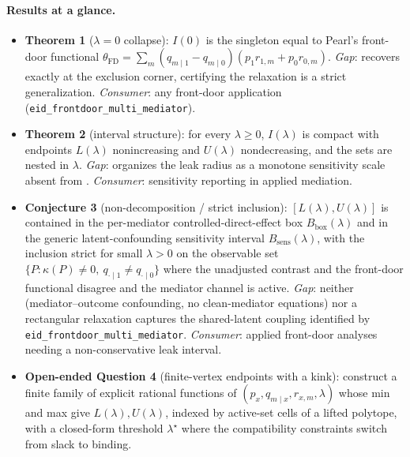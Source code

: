 \documentclass[11pt]{article}
\theoremstyle{definition}
\theoremstyle{plain}
\theoremstyle{remark}
\begin{document}
\paragraph{Results at a glance.}
\begin{itemize}[leftmargin=1.5em,itemsep=2pt]
  \item \textbf{Theorem 1} ($\lambda=0$ collapse): $I(0)$ is the singleton equal to Pearl's front-door
        functional $\theta_{\mathrm{FD}}=\sum_m(q_{m\mid1}-q_{m\mid0})(p_1 r_{1,m}+p_0 r_{0,m})$.
        \emph{Gap}: recovers \citet{Pearl1995CausalDiagrams} exactly at the exclusion corner, certifying
        the relaxation is a strict generalization. \emph{Consumer}: any front-door application
        (\texttt{eid\_frontdoor\_multi\_mediator}).
  \item \textbf{Theorem 2} (interval structure): for every $\lambda\ge0$, $I(\lambda)$ is compact with
        endpoints $L(\lambda)$ nonincreasing and $U(\lambda)$ nondecreasing, and the sets are nested in
        $\lambda$. \emph{Gap}: organizes the leak radius as a monotone sensitivity scale absent from
        \citet{Pearl1995CausalDiagrams}. \emph{Consumer}: sensitivity reporting in applied mediation.
  \item \textbf{Conjecture 3} (non-decomposition / strict inclusion): $[L(\lambda),U(\lambda)]$ is
        contained in the per-mediator controlled-direct-effect box $B_{\mathrm{box}}(\lambda)$ and in the
        generic latent-confounding sensitivity interval $B_{\mathrm{sens}}(\lambda)$, with the inclusion
        strict for small $\lambda>0$ on the observable set
        $\{P:\kappa(P)\neq0,\ q_{\cdot\mid1}\neq q_{\cdot\mid0}\}$ where the unadjusted contrast and the
        front-door functional disagree and the mediator channel is active. \emph{Gap}: neither
        \citet{DingVanderWeele2016SharpMediationSensitivity} (mediator--outcome confounding, no
        clean-mediator equations) nor a rectangular relaxation captures the shared-latent coupling identified
        by \texttt{eid\_frontdoor\_multi\_mediator}. \emph{Consumer}: applied front-door analyses needing a
        non-conservative leak interval.
  \item \textbf{Open-ended Question 4} (finite-vertex endpoints with a kink): construct a finite family of
        explicit rational functions of $(p_x,q_{m\mid x},r_{x,m},\lambda)$ whose min and max give
        $L(\lambda),U(\lambda)$, indexed by active-set cells of a lifted polytope, with a closed-form
        threshold $\lambda^\star$ where the compatibility constraints switch from slack to binding.

\end{itemize}
\end{document}
